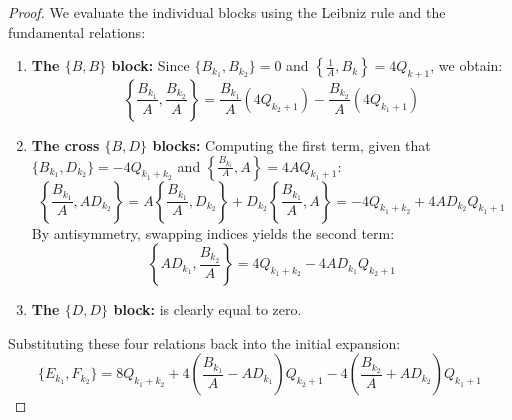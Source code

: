 \documentclass[reqno,11pt]{amsart}
\theoremstyle{plain}
\numberwithin{equation}{section}
\begin{document}
{\begin{proof}
We evaluate the individual blocks using the Leibniz rule and the fundamental relations:
\begin{enumerate}
	
	\item \textbf{The $\{B, B\}$ block:} Since $\{B_{k_1}, B_{k_2}\} = 0$ and $\left\{\frac{1}{A}, B_k\right\} = 4Q_{k+1}$, we obtain:
	\begin{equation}
		\left\{ \frac{B_{k_1}}{A}, \frac{B_{k_2}}{A} \right\} = \frac{B_{k_1}}{A}(4Q_{k_2+1}) - \frac{B_{k_2}}{A}(4Q_{k_1+1})
	\end{equation}
	
	\item \textbf{The cross $\{B, D\}$ blocks:} Computing the first term, given that $\{B_{k_1}, D_{k_2}\} = -4Q_{k_1+k_2}$ and $\left\{\frac{B_{k_1}}{A}, A\right\} = 4AQ_{k_1+1}$:
	\begin{equation}
		\left\{ \frac{B_{k_1}}{A}, A D_{k_2} \right\} = A\left\{\frac{B_{k_1}}{A}, D_{k_2}\right\} + D_{k_2}\left\{\frac{B_{k_1}}{A}, A\right\} = -4Q_{k_1+k_2} + 4AD_{k_2}Q_{k_1+1}
	\end{equation}
	By antisymmetry, swapping indices yields the second term:
	\begin{equation}
		\left\{ A D_{k_1}, \frac{B_{k_2}}{A} \right\} = 4Q_{k_1+k_2} - 4AD_{k_1}Q_{k_2+1}
	\end{equation}
	\item \textbf{The $\{D, D\}$ block:}  is clearly equal to zero.
\end{enumerate}

Substituting these four relations back into the initial expansion:
\begin{equation}
	\{E_{k_1}, F_{k_2}\} = 8Q_{k_1+k_2} + 4\left(\frac{B_{k_1}}{A} - AD_{k_1}\right)Q_{k_2+1} - 4\left(\frac{B_{k_2}}{A} + AD_{k_2}\right)Q_{k_1+1}
\end{equation}


\end{proof}}
\end{document}
